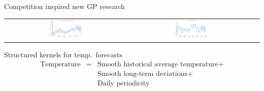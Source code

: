 \begin{frame}{Competition inspired new GP research}
\begin{tabular}{ccc}
\includegraphics[width=0.32\textwidth]{figures/monthly-canadian-total-unemploym/monthly-canadian-total-unemploym_all} & 
\includegraphics[width=0.32\textwidth]{figures/monthly-sales-of-us-houses-thous/monthly-sales-of-us-houses-thous_all}
  \end{tabular}
\end{frame}

\begin{frame}{Structured kernels for temp.\ forecasts}
  \begin{eqnarray*}
    \textrm{Temperature} & = & \textrm{Smooth historical average temperature} +  \\
    & & \textrm{Smooth long-term deviations} + \\
    & & \textrm{Daily periodicity}
  \end{eqnarray*}
  \begin{center}
    
  \end{center}
\end{frame}


